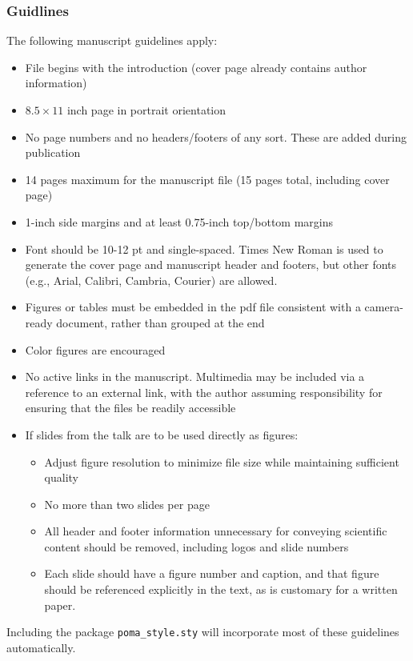 \documentclass[12pt,letter]{article}
\begin{document}
\subsubsection{Guidlines}

The following manuscript guidelines apply:

\begin{itemize}
	\item File begins with the introduction (cover page already contains author information)
	\item $8.5\times 11$ inch page in portrait orientation
	\item No page numbers and no headers/footers of any sort. These are added during publication
	\item 14 pages maximum for the manuscript file (15 pages total, including cover page)
	\item 1-inch side margins and at least 0.75-inch top/bottom margins
	\item Font should be 10-12 pt and single-spaced. Times New Roman is used to generate the cover page and manuscript header and footers, but other fonts (e.g., Arial, Calibri, Cambria, Courier) are allowed.
	\item Figures or tables must be embedded in the pdf file consistent with a camera-ready document, rather than grouped at the end
	\item Color figures are encouraged
	\item No active links in the manuscript. Multimedia may be included via a reference to an external link, with the author assuming responsibility for ensuring that the files be readily accessible
	\item If slides from the talk are to be used directly as figures:
\begin{itemize}
	\item Adjust figure resolution to minimize file size while maintaining sufficient quality
	\item No more than two slides per page
	\item All header and footer information unnecessary for conveying scientific content should be removed, including logos and slide numbers
	\item Each slide should have a figure number and caption, and that figure should be referenced explicitly in the text, as is customary for a written paper.
\end{itemize}
\end{itemize}
Including the package \texttt{poma\_style.sty} will incorporate most of these guidelines automatically.
\end{document}
